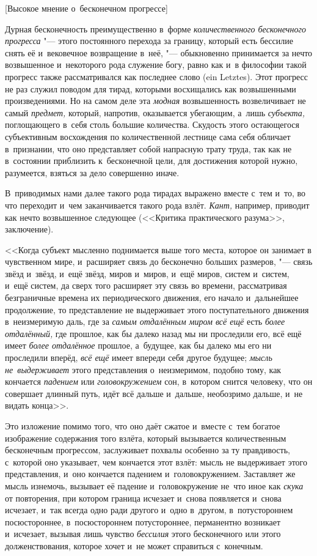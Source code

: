 %
{[Высокое мнение о~бесконечном прогрессе]}

Дурная бесконечность преимущественно в~форме
{\em количественного бесконечного прогресса} "--- этого постоянного перехода за
границу, который есть бессилие снять её и~вековечное возвращение в~неё,
"--- обыкновенно принимается за нечто возвышенное и~некоторого рода служение
богу, равно как и~в философии такой прогресс также рассматривался как последнее
слово (ein Letz\-tes). Этот прогресс не раз служил поводом для тирад, которыми
восхищались как возвышенными произведениями. Но на самом деле эта {\em модная}
возвышенность возвеличивает не самый {\em предмет,} который, напротив,
оказывается убегающим, а~лишь {\em субъекта,} поглощающего в~себя столь большие
количества. Скудость этого остающегося субъективным восхождения по
количественной лестнице сама себя обличает в~признании, что оно представляет
собой напрасную трату труда, так как не в~состоянии приблизить к~бесконечной
цели, для достижения которой нужно, разумеется, взяться за дело совершенно
иначе.

В~приводимых нами далее такого рода тирадах выражено вместе с~тем и~то, во что
переходит и~чем заканчивается такого рода взлёт. {\em Кант,} например, приводит
как нечто возвышенное следующее (<<Критика практического разума>>, заключение).

<<Когда субъект мысленно поднимается выше того места, которое он занимает в
чувственном мире, и~расширяет связь до бесконечно больших размеров, "--- связь
звёзд и~звёзд, и~ещё звёзд, миров и~миров, и~ещё миров, систем и~систем, и~ещё
систем, да сверх того расширяет эту связь во времени, рассматривая безграничные
времена их периодического движения, его начало и~дальнейшее продолжение, то
представление не выдерживает этого поступательного движения в~неизмеримую даль,
где за {\em самым отдалённым миром всё ещё} есть {\em более отдалённый,} где
прошлое, как бы далеко назад мы ни проследили его, всё ещё имеет
{\em более отдалённое} прошлое, а~будущее, как бы далеко мы его ни проследили
вперёд, {\em всё ещё} имеет впереди себя другое будущее;
{\em мысль не~выдерживает} этого представления о~неизмеримом, подобно тому, как
кончается {\em падением} или {\em головокружением} сон, в~котором снится
человеку, что он совершает длинный путь, идёт всё дальше и~дальше, необозримо
дальше, и~не видать конца>>.

Это изложение помимо того, что оно даёт сжатое и~вместе с~тем богатое
изображение содержания того взлёта, который вызывается количественным
бесконечным прогрессом, заслуживает похвалы особенно за ту правдивость,
с~которой оно указывает, чем кончается этот взлёт: мысль не выдерживает этого
представления, и~оно кончается падением и~головокружением. Заставляет же мысль
изнемочь, вызывает её падение и~головокружение не~что иное как {\em скука} от
повторения, при котором граница исчезает и~снова появляется и~снова исчезает,
и~так всегда одно ради другого и~одно в~другом, в~потустороннем посюстороннее,
в~посюстороннем потустороннее, перманентно возникает и~исчезает, вызывая лишь
чувство {\em бессилия} этого бесконечного или этого долженствования, которое
хочет и~не может справиться с~конечным.

